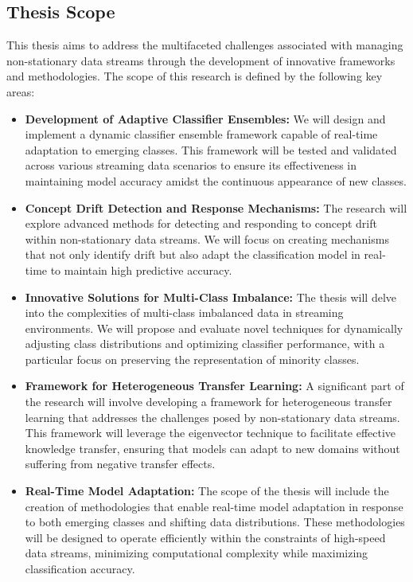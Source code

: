 \subsection{Thesis Scope}

This thesis aims to address the multifaceted challenges associated with managing non-stationary data streams through the development of innovative frameworks and methodologies. The scope of this research is defined by the following key areas:
\begin{itemize}
    \item \textbf{Development of Adaptive Classifier Ensembles:} We will design and implement a dynamic classifier ensemble framework capable of real-time adaptation to emerging classes. This framework will be tested and validated across various streaming data scenarios to ensure its effectiveness in maintaining model accuracy amidst the continuous appearance of new classes.
    \item \textbf{Concept Drift Detection and Response Mechanisms:} The research will explore advanced methods for detecting and responding to concept drift within non-stationary data streams. We will focus on creating mechanisms that not only identify drift but also adapt the classification model in real-time to maintain high predictive accuracy.
    \item \textbf{Innovative Solutions for Multi-Class Imbalance:} The thesis will delve into the complexities of multi-class imbalanced data in streaming environments. We will propose and evaluate novel techniques for dynamically adjusting class distributions and optimizing classifier performance, with a particular focus on preserving the representation of minority classes.
    \item \textbf{Framework for Heterogeneous Transfer Learning:} A significant part of the research will involve developing a framework for heterogeneous transfer learning that addresses the challenges posed by non-stationary data streams. This framework will leverage the eigenvector technique to facilitate effective knowledge transfer, ensuring that models can adapt to new domains without suffering from negative transfer effects.
    \item \textbf{Real-Time Model Adaptation:} The scope of the thesis will include the creation of methodologies that enable real-time model adaptation in response to both emerging classes and shifting data distributions. These methodologies will be designed to operate efficiently within the constraints of high-speed data streams, minimizing computational complexity while maximizing classification accuracy.
\end{itemize}

